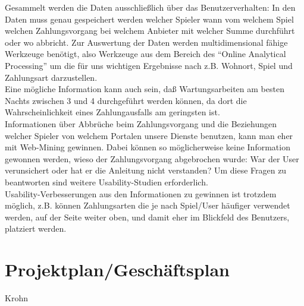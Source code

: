 \documentclass[a4paper,10pt]{article}
\begin{document}
Gesammelt werden die Daten ausschließlich über das Benutzerverhalten:
In den Daten muss genau gespeichert werden welcher Spieler wann vom welchem Spiel welchen Zahlungsvorgang bei welchem Anbieter mit welcher Summe durchführt oder wo abbricht.
Zur Auswertung der Daten werden multidimensional fähige Werkzeuge benötigt, also Werkzeuge aus dem Bereich des "`Online Analytical Processing"' um die für uns wichtigen Ergebnisse
nach z.B. Wohnort, Spiel und Zahlungsart darzustellen.\\
Eine mögliche Information kann auch sein, daß Wartungsarbeiten am besten Nachts zwischen 3 und 4 durchgeführt werden können, da dort die Wahrscheinlichkeit eines Zahlungausfalls am geringsten ist.\\
Informationen über Abbrüche beim Zahlungsvorgang und die Beziehungen welcher Spieler von welchem Portalen unsere Dienste benutzen, kann man eher mit Web-Mining gewinnen.
Dabei können so möglicherweise keine Information gewonnen werden, wieso der Zahlungsvorgang abgebrochen wurde: War der User verunsichert oder hat er die Anleitung nicht verstanden?
Um diese Fragen zu beantworten sind weitere Usability-Studien erforderlich.\\
Usability-Verbesserungen aus den Informationen zu gewinnen ist trotzdem möglich, z.B. können Zahlungsarten die je nach Spiel/User häufiger verwendet werden, auf der Seite weiter oben, und damit eher im Blickfeld des Benutzers, platziert werden.

\section{Projektplan/Geschäftsplan}\label{labelGeschaeftsplan}
Krohn



\end{document}
